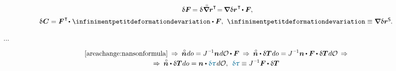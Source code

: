 \begin{otherlanguage}{russian}
\begin{equation}
\begin{array}{c}
\:\,
\variation{\bm{F}} \hspace{-0.2ex} = \variation{\hspace{.1ex} \boldnablacircled \currentlocationvector^{\T}} \hspace{-0.4ex}
= \hspace{-0.2ex} \boldnabla \hspace{.1ex} \variation{\currentlocationvector}^{\hspace{.12ex}\T} \hspace{-0.25ex} \dotp \bm{F}
\hspace{-0.1ex} ,
\\[.5em]
%
\variation{\hspace{.12ex}\bm{C}} = \bm{F}^{\hspace{.1ex}\T} \hspace{-0.32ex} \dotp \hspace{.1ex} \infinimentpetitdeformationdevariation \dotp \bm{F} ,
\:\,
\infinimentpetitdeformationdevariation \equiv \boldnabla \hspace{.1ex} \variation{\currentlocationvector}^{\mathsf{S}}
\hspace{-0.15ex} .
\end{array}
\end{equation}

...

\begin{equation*}\begin{array}{c}
\eqref{areachange:nansonformula}
\:\Rightarrow\:
%
\initialunitnormal \hspace{.1ex} do = J^{\hspace{.12ex}\expminusone} \currentunitnormal \hspace{.1ex} d\mathcal{O} \hspace{-0.1ex} \dotp \bm{F}
\:\Rightarrow\:
%
\initialunitnormal \dotp \variation{\firstpiolakirchhoffstress} \hspace{.1ex} do
= J^{\hspace{.12ex}\expminusone} \currentunitnormal \hspace{-0.1ex} \dotp \bm{F} \hspace{-0.1ex} \dotp \variation{\firstpiolakirchhoffstress} \hspace{.1ex} d\mathcal{O}
\,\Rightarrow
\\[.2em]
%
\Rightarrow\:
\initialunitnormal \dotp \variation{\firstpiolakirchhoffstress} \hspace{.1ex} do
= \currentunitnormal \dotp \varbivalent{\hspace{-0.2ex}\cauchystress} \hspace{.25ex} d\mathcal{O} ,
\:\:
\varbivalent{\hspace{-0.2ex}\cauchystress} \equiv J^{\hspace{.12ex}\expminusone} \bm{F} \hspace{-0.1ex} \dotp \variation{\firstpiolakirchhoffstress}
\end{array}\end{equation*}


\end{otherlanguage}
